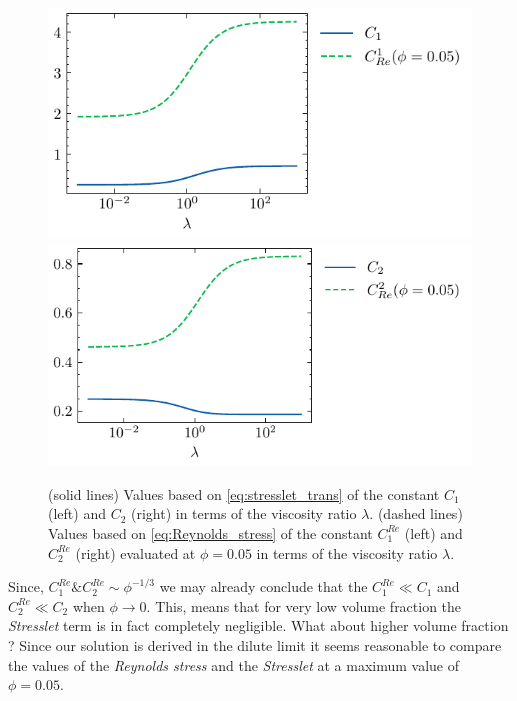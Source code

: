 \begin{figure}
    \includegraphics[height=0.25\textwidth]{image/Theory/C1.pdf}
    \includegraphics[height=0.25\textwidth]{image/Theory/C2.pdf}
    \caption{
    (solid lines) Values based on \ref{eq:stresslet_trans} of the constant $C_1$ (left)  and $C_2$ (right) in terms of the viscosity ratio $\lambda$.
    (dashed lines) Values based on \ref{eq:Reynolds_stress} of the constant $C_1^{Re}$ (left) and $C_2^{Re}$ (right)  evaluated at $\phi = 0.05$ in terms of the viscosity ratio $\lambda$.
    }
    \label{fig:relative_comparaison}
\end{figure}
Since, $C_1^{Re} \& C_2^{Re} \sim \phi^{-1/3}$ we may already conclude that the $C_1^{Re} \ll C_1$ and $C_2^{Re} \ll C_2$ when $\phi \to 0$. 
This, means that for very low volume fraction the \textit{Stresslet} term  is in fact completely negligible. 
What about higher volume fraction ? 
Since our solution is derived in the dilute limit it seems reasonable to compare the values of the \textit{Reynolds stress} and the \textit{Stresslet} at a maximum value of $\phi = 0.05$. 



